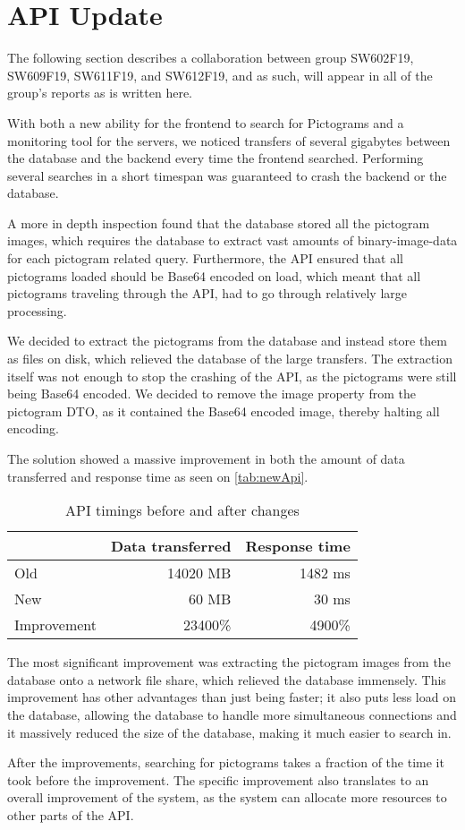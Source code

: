 \section{API Update}\label{CollabAPIUpdate}
The following section describes a collaboration between group SW602F19, SW609F19, SW611F19, and SW612F19, and as such, will appear in all of the group's reports as is written here.

With both a new ability for the frontend to search for Pictograms and a monitoring tool for the servers, we noticed transfers of several gigabytes between the database and the backend every time the frontend searched. 
Performing several searches in a short timespan was guaranteed to crash the backend or the database.

A more in depth inspection found that the database stored all the pictogram images, which requires the database to extract vast amounts of binary-image-data for each pictogram related query. 
Furthermore, the API ensured that all pictograms loaded should be Base64 encoded on load, which meant that all pictograms traveling through the API, had to go through relatively large processing.

We decided to extract the pictograms from the database and instead store them as files on disk, which relieved the database of the large transfers. 
The extraction itself was not enough to stop the crashing of the API, as the pictograms were still being Base64 encoded. 
We decided to remove the image property from the pictogram DTO, as it contained the Base64 encoded image, thereby halting all encoding.

The solution showed a massive improvement in both the amount of data transferred and response time as seen on \autoref{tab:newApi}.

\begin{table}[H]
    \centering
    \begin{tabular}{|l|r|r|}
    \hline
                    & Data transferred  & Response time \\ \hline
        Old         & 14020 MB         & 1482 ms      \\ \hline 
        New         & 60 MB             & 30 ms         \\ \hline
        Improvement & 23400\%          & 4900\%       \\ \hline
    \end{tabular}
    \caption{API timings before and after changes}
    \label{tab:newApi}
\end{table}

The most significant improvement was extracting the pictogram images from the database onto a network file share, which relieved the database immensely. 
This improvement has other advantages than just being faster; it also puts less load on the database, allowing the database to handle more simultaneous connections and it massively reduced the size of the database, making it much easier to search in.

After the improvements, searching for pictograms takes a fraction of the time it took before the improvement. 
The specific improvement also translates to an overall improvement of the system, as the system can allocate more resources to other parts of the API.
